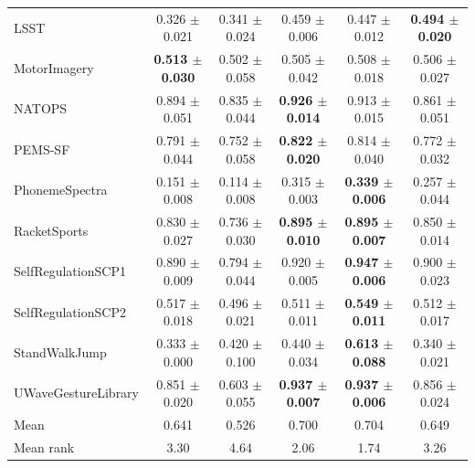 \begin{tabular}{lccccc}
LSST & 0.326 $\pm$ 0.021 & 0.341 $\pm$ 0.024 & 0.459 $\pm$ 0.006 & 0.447 $\pm$ 0.012 & \textbf{0.494 $\pm$ 0.020} \\
MotorImagery & \textbf{0.513 $\pm$ 0.030} & 0.502 $\pm$ 0.058 & 0.505 $\pm$ 0.042 & 0.508 $\pm$ 0.018 & 0.506 $\pm$ 0.027 \\
NATOPS & 0.894 $\pm$ 0.051 & 0.835 $\pm$ 0.044 & \textbf{0.926 $\pm$ 0.014} & 0.913 $\pm$ 0.015 & 0.861 $\pm$ 0.051 \\
PEMS-SF & 0.791 $\pm$ 0.044 & 0.752 $\pm$ 0.058 & \textbf{0.822 $\pm$ 0.020} & 0.814 $\pm$ 0.040 & 0.772 $\pm$ 0.032 \\
PhonemeSpectra & 0.151 $\pm$ 0.008 & 0.114 $\pm$ 0.008 & 0.315 $\pm$ 0.003 & \textbf{0.339 $\pm$ 0.006} & 0.257 $\pm$ 0.044 \\
RacketSports & 0.830 $\pm$ 0.027 & 0.736 $\pm$ 0.030 & \textbf{0.895 $\pm$ 0.010} & \textbf{0.895 $\pm$ 0.007} & 0.850 $\pm$ 0.014 \\
SelfRegulationSCP1 & 0.890 $\pm$ 0.009 & 0.794 $\pm$ 0.044 & 0.920 $\pm$ 0.005 & \textbf{0.947 $\pm$ 0.006} & 0.900 $\pm$ 0.023 \\
SelfRegulationSCP2 & 0.517 $\pm$ 0.018 & 0.496 $\pm$ 0.021 & 0.511 $\pm$ 0.011 & \textbf{0.549 $\pm$ 0.011} & 0.512 $\pm$ 0.017 \\
StandWalkJump & 0.333 $\pm$ 0.000 & 0.420 $\pm$ 0.100 & 0.440 $\pm$ 0.034 & \textbf{0.613 $\pm$ 0.088} & 0.340 $\pm$ 0.021 \\
UWaveGestureLibrary & 0.851 $\pm$ 0.020 & 0.603 $\pm$ 0.055 & \textbf{0.937 $\pm$ 0.007} & \textbf{0.937 $\pm$ 0.006} & 0.856 $\pm$ 0.024 \\
\midrule
Mean & 0.641 & 0.526 & 0.700 & 0.704 & 0.649 \\
Mean rank & 3.30 & 4.64 & 2.06 & 1.74 & 3.26 \\
\bottomrule
\end{tabular}
